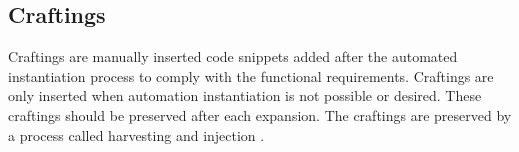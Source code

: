 \subsection{Craftings}

Craftings are manually inserted code snippets added after the automated instantiation
process to comply with the functional requirements. Craftings are only inserted when
automation instantiation is not possible or desired. These craftings should be preserved
after each expansion. The craftings are preserved by a process called harvesting and
injection \parencite[405-406]{mannaert_normalized_2016}.